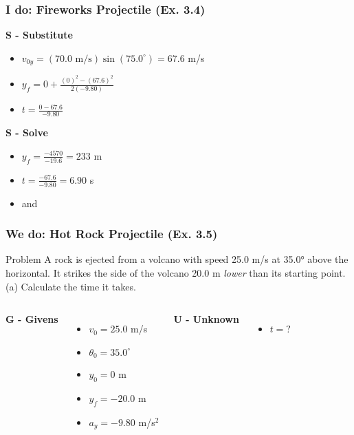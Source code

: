 \documentclass{beamer}
\begin{document}
\begin{frame}
\frametitle{I do: Fireworks Projectile (Ex. 3.4)}

\textbf{S - Substitute}
\begin{itemize}
\item $v_{0y} = (70.0 \text{ m/s})\sin(75.0^\circ) = 67.6$ m/s
\item $y_f = 0 + \frac{(0)^2 - (67.6)^2}{2(-9.80)}$
\item $t = \frac{0 - 67.6}{-9.80}$
\end{itemize}
\pause
\textbf{S - Solve}
\begin{itemize}
\item $y_f = \frac{-4570}{-19.6} = 233$ m
\item $t = \frac{-67.6}{-9.80} = 6.90$ s
\item {} and 
\end{itemize}
\end{frame}

\begin{frame}
\frametitle{We do: Hot Rock Projectile (Ex. 3.5)}
\begin{block}{Problem}
A rock is ejected from a volcano with speed 25.0 m/s at 35.0° above the horizontal. It strikes the side of the volcano 20.0 m \textit{lower} than its starting point. (a) Calculate the time it takes.
\end{block}
\pause
\begin{columns}[T]
\textbf{G - Givens}
\begin{itemize}
\item $v_0 = 25.0$ m/s
\item $\theta_0 = 35.0^\circ$
\item $y_0 = 0$ m
\item $y_f = -20.0$ m
\item $a_y = -9.80$ m/s$^2$
\end{itemize}
\pause
{}
\textbf{U - Unknown}
\begin{itemize}
\item $t = ?$
\end{itemize}
\end{columns}
\end{frame}
\end{document}
